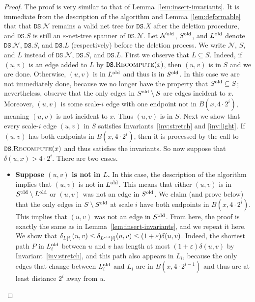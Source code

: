 \documentclass[11pt]{article}
\let\e\varepsilon               %
\newcommand{\cN}{\mathcal{N}}
\newcommand{\dist}{\ensuremath{\delta}}
\newcommand{\DS}{\texttt{DS}}
\newcommand{\points}{{\ensuremath{\DS.X}}}
\newcommand{\sparse}{{\ensuremath{\DS.S}}}
\newcommand{\net}{{\ensuremath{\DS.\cN}}}
\newcommand{\light}{{\ensuremath{\DS.L}}}
\begin{document}
\begin{proof}
The proof is very similar to that of Lemma~\ref{lem:insert-invariants}.
    It is immediate from the description of the algorithm and Lemma~\ref{lem:deformable} that that $\net$ remains a valid net tree for $\points$ after the deletion procedure, and $\sparse$ is still an $\e$-net-tree spanner of $\net$. Let $\cN^{\rm old}$, $S^{\rm old}$, and $L^{\rm old}$ denote $\net$, $\sparse$, and $\light$ (respectively) before the deletion process. We write $\cN$, $S$, and $L$ instead of $\net$, $\sparse$, and $\light$.
%
%
    First we observe that $L \subseteq S$. Indeed, if $(u,v)$ is an edge added to $L$ by $\DS.\textsc{Recompute}(x)$, then $(u,v)$ is in $S$ and we are done. Otherwise, $(u,v)$ is in $L^{\rm old}$ and thus is in $S^{\rm old}$. In this case we are not immediately done, because we no longer have the property that $S^{\rm old} \subseteq S$; nevertheless, observe that the only edges in $S^{\rm old} \setminus S$ are edges incident to $x$. Moreover, $(u,v)$ is some scale-$i$ edge with one endpoint not in $B(x, 4 \cdot 2^i)$,
    meaning $(u,v)$ is not incident to $x$. Thus $(u,v)$ is in $S$.
%
    Next we show that every scale-$i$ edge $(u,v)$ in $S$ satisfies Invariants~\ref{inv:stretch} and \ref{inv:light}. If $(u,v)$ has both endpoints in $B(x, 4 \cdot 2^i)$, then it is processed by the call to $\DS.\textsc{Recompute}(x)$ and thus satisfies the invariants. So now suppose that $\dist(u, x) > 4 \cdot 2^i$. There are two cases.
    \begin{itemize}
        \item \textbf{\boldmath Suppose $(u,v)$ is not in $L$.} In this case, the description of the algorithm implies that $(u,v)$ is not in $L^{\rm old}$. This means that either $(u,v)$ is in $S^{\rm old} \setminus L^{\rm old}$ or $(u,v)$ was not an edge in $S^{\rm old}$. We claim (and prove below) that the only edges in $S \setminus S^{\rm old}$ at scale $i$ have both endpoints in $B(x, 4 \cdot 2^i)$. This implies that $(u,v)$ was not an edge in $S^{\rm old}$.
        From here, the proof is exactly the same as in Lemma~\ref{lem:insert-invariants}, and we repeat it here. We show that $\dist_{L[i]}(u,v) \le \dist_{L^{\rm old}[i]}(u,v) \le (1+\e) \dist(u,v)$. Indeed, the shortest path $P$ in $L_i^{\rm old}$ between $u$ and $v$ has length at most $(1+\e) \dist(u,v)$ by Invariant~\ref{inv:stretch}, and this path also appears in $L_i$, because the only edges that change between $L_i^{\rm old}$ and $L_i$ are in $B(x, 4 \cdot 2^{i-1})$ and thus are at least distance $2^i$ away from $u$.

\end{itemize}
\end{proof}
\end{document}
